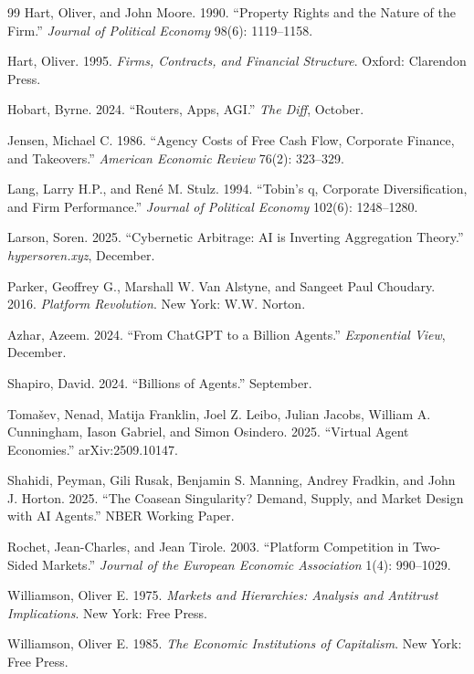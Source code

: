 \documentclass[12pt]{article}
\theoremstyle{definition}
\begin{document}
\begin{thebibliography}{99}
Hart, Oliver, and John Moore. 1990. ``Property Rights and the Nature of the Firm.'' \textit{Journal of Political Economy} 98(6): 1119--1158.

Hart, Oliver. 1995. \textit{Firms, Contracts, and Financial Structure}. Oxford: Clarendon Press.

Hobart, Byrne. 2024. ``Routers, Apps, AGI.'' \textit{The Diff}, October.

Jensen, Michael C. 1986. ``Agency Costs of Free Cash Flow, Corporate Finance, and Takeovers.'' \textit{American Economic Review} 76(2): 323--329.

Lang, Larry H.P., and Ren\'{e} M. Stulz. 1994. ``Tobin's q, Corporate Diversification, and Firm Performance.'' \textit{Journal of Political Economy} 102(6): 1248--1280.

Larson, Soren. 2025. ``Cybernetic Arbitrage: AI is Inverting Aggregation Theory.'' \textit{hypersoren.xyz}, December.

Parker, Geoffrey G., Marshall W. Van Alstyne, and Sangeet Paul Choudary. 2016. \textit{Platform Revolution}. New York: W.W. Norton.

Azhar, Azeem. 2024. ``From ChatGPT to a Billion Agents.'' \textit{Exponential View}, December.

Shapiro, David. 2024. ``Billions of Agents.'' September.

Toma\v{s}ev, Nenad, Matija Franklin, Joel Z. Leibo, Julian Jacobs, William A. Cunningham, Iason Gabriel, and Simon Osindero. 2025. ``Virtual Agent Economies.'' arXiv:2509.10147.

Shahidi, Peyman, Gili Rusak, Benjamin S. Manning, Andrey Fradkin, and John J. Horton. 2025. ``The Coasean Singularity? Demand, Supply, and Market Design with AI Agents.'' NBER Working Paper.

Rochet, Jean-Charles, and Jean Tirole. 2003. ``Platform Competition in Two-Sided Markets.'' \textit{Journal of the European Economic Association} 1(4): 990--1029.

Williamson, Oliver E. 1975. \textit{Markets and Hierarchies: Analysis and Antitrust Implications}. New York: Free Press.

Williamson, Oliver E. 1985. \textit{The Economic Institutions of Capitalism}. New York: Free Press.

\end{thebibliography}
\end{document}
